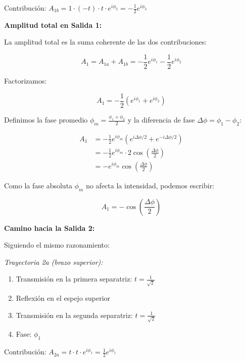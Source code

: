 \documentclass[12pt,a4paper]{article}
\begin{document}
Contribución: $A_{1b} = 1 \cdot (-t) \cdot t \cdot e^{i\phi_2} = -\frac{1}{2} e^{i\phi_2}$

\textbf{Amplitud total en Salida 1:}

La amplitud total es la suma coherente de las dos contribuciones:

\begin{equation}
    A_1 = A_{1a} + A_{1b} = -\frac{1}{2} e^{i\phi_1} - \frac{1}{2} e^{i\phi_2}
\end{equation}

Factorizamos:

\begin{equation}
    A_1 = -\frac{1}{2} \left( e^{i\phi_1} + e^{i\phi_2} \right)
\end{equation}

Definimos la fase promedio $\phi_m = \frac{\phi_1 + \phi_2}{2}$ y la diferencia de fase $\Delta\phi = \phi_1 - \phi_2$:

\begin{align}
    A_1 &= -\frac{1}{2} e^{i\phi_m} \left( e^{i\Delta\phi/2} + e^{-i\Delta\phi/2} \right) \\
    &= -\frac{1}{2} e^{i\phi_m} \cdot 2\cos\left(\frac{\Delta\phi}{2}\right) \\
    &= -e^{i\phi_m} \cos\left(\frac{\Delta\phi}{2}\right)
\end{align}

Como la fase absoluta $\phi_m$ no afecta la intensidad, podemos escribir:

\begin{equation}
    \boxed{A_1 = -\cos\left(\frac{\Delta\phi}{2}\right)}
\end{equation}

\textbf{Camino hacia la Salida 2:}

Siguiendo el mismo razonamiento:

\textit{Trayectoria 2a (brazo superior):}
\begin{enumerate}
    \item Transmisión en la primera separatriz: $t = \frac{1}{\sqrt{2}}$
    \item Reflexión en el espejo superior
    \item Transmisión en la segunda separatriz: $t = \frac{1}{\sqrt{2}}$
    \item Fase: $\phi_1$
\end{enumerate}

Contribución: $A_{2a} = t \cdot t \cdot e^{i\phi_1} = \frac{1}{2} e^{i\phi_1}$
\end{document}
